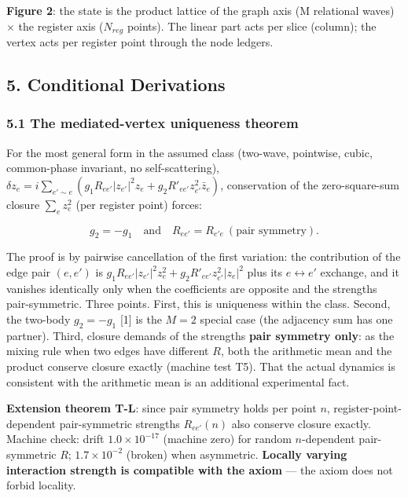 \documentclass[
  a4paper,
]{article}
\begin{document}
\textbf{Figure 2}: the state is the product lattice of the graph axis (M
relational waves) \(\times\) the register axis (\(N_{reg}\) points). The
linear part acts per slice (column); the vertex acts per register point
through the node ledgers.

\subsection{5. Conditional Derivations}\label{conditional-derivations}

\subsubsection{5.1 The mediated-vertex uniqueness
theorem}\label{the-mediated-vertex-uniqueness-theorem}

For the most general form in the assumed class (two-wave, pointwise,
cubic, common-phase invariant, no self-scattering),
\(\delta z_e = i\sum_{e'\sim e}(g_1 R_{ee'}|z_{e'}|^2 z_e + g_2 R'_{ee'} z_{e'}^2\bar z_e)\),
conservation of the zero-square-sum closure \(\sum_e z_e^2\) (per
register point) forces:

\[g_2 = -g_1 \quad\text{and}\quad R_{ee'} = R_{e'e}\ (\text{pair symmetry}).\]

The proof is by pairwise cancellation of the first variation: the
contribution of the edge pair \((e,e')\) is
\(g_1 R_{ee'}|z_{e'}|^2 z_e^2 + g_2 R'_{ee'} z_{e'}^2 |z_e|^2\) plus its
\(e\leftrightarrow e'\) exchange, and it vanishes identically only when
the coefficients are opposite and the strengths pair-symmetric. Three
points. First, this is uniqueness within the class. Second, the two-body
\(g_2=-g_1\) {[}1{]} is the \(M=2\) special case (the adjacency sum has
one partner). Third, closure demands of the strengths \textbf{pair
symmetry only}: as the mixing rule when two edges have different \(R\),
both the arithmetic mean and the product conserve closure exactly
(machine test T5). That the actual dynamics is consistent with the
arithmetic mean is an additional experimental fact.

\textbf{Extension theorem T-L}: since pair symmetry holds per point
\(n\), register-point-dependent pair-symmetric strengths \(R_{ee'}(n)\)
also conserve closure exactly. Machine check: drift
\(1.0\times10^{-17}\) (machine zero) for random \(n\)-dependent
pair-symmetric \(R\); \(1.7\times10^{-2}\) (broken) when asymmetric.
\textbf{Locally varying interaction strength is compatible with the
axiom} --- the axiom does not forbid locality.
\end{document}
